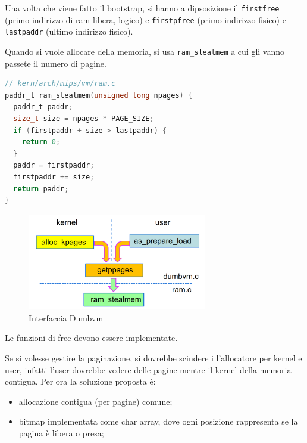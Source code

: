 \documentclass[12pt]{article}
\begin{document}
Una volta che viene fatto il bootstrap, si hanno a dipsosizione il \texttt{firstfree} (primo indirizzo di ram libera, logico) e \texttt{firstpfree} (primo indirizzo fisico) e \texttt{lastpaddr} (ultimo indirizzo fisico).

Quando si vuole allocare della memoria, si usa \texttt{ram\_stealmem} a cui gli vanno passete il numero di pagine.
\begin{lstlisting}[language=c]
// kern/arch/mips/vm/ram.c
paddr_t ram_stealmem(unsigned long npages) {
  paddr_t paddr;
  size_t size = npages * PAGE_SIZE;
  if (firstpaddr + size > lastpaddr) {
    return 0;
  }
  paddr = firstpaddr;
  firstpaddr += size;
  return paddr;
}
\end{lstlisting}
\begin{figure}[H]
  \centering
  \includegraphics[width=0.7\textwidth]{interfaccia-dumbvm.png}
  \caption{Interfaccia Dumbvm}
  \label{fig:interfaccia-dumbvm}
\end{figure}
Le funzioni di free devono essere implementate.


Se si volesse gestire la paginazione, si dovrebbe scindere i l'allocatore per kernel e user, infatti l'user dovrebbe vedere delle pagine mentre il kernel della memoria contigua. Per ora la soluzione proposta \`e:
\begin{itemize}
  \item allocazione contigua (per pagine) comune;
  \item bitmap implementata come char array, dove ogni posizione rappresenta se la pagina \`e libera o presa;
\end{itemize}










\newpage
\end{document}

